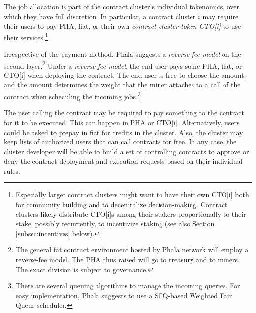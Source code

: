 \documentclass[11pt, a4paper, twocolumn]{article}
\begin{document}
The job allocation is part of the contract cluster's individual tokenomics, over which they have full discretion. In particular, a contract cluster $i$ may require their users to pay PHA, fiat, or their own \textit{contract cluster token} \textit{CTO[i]} to use their services.\footnote{%
	Especially larger contract clusters might want to have their own CTO[i] both for community building and to decentralize decision-making. Contract clusters likely distribute CTO[i]s among their stakers proportionally to their stake, possibly recurrently, to incentivize staking (see also Section \ref{subsec:incentives} below).}

Irrespective of the payment method, Phala suggests a \textit{reverse-fee model} on the second layer.\footnote{%
	The general fat contract environment hosted by Phala network will employ a reverse-fee model. The PHA thus raised will go to treasury and to miners. The exact division is subject to governance.}
Under a \textit{reverse-fee model}, the end-user pays some PHA, fiat, or CTO[i] when deploying the contract. The end-user is free to choose the amount, and the amount determines the weight that the miner attaches to a call of the contract when scheduling the incoming jobs.\footnote{%
	There are several queuing algorithms to manage the incoming queries. For easy implementation, Phala suggests to use a SFQ-based Weighted Fair Queue scheduler.}

The user calling the contract may be required to pay something to the contract for it to be executed. This can happen in PHA or CTO[i]. Alternatively, users could be asked to prepay in fiat for credits in the cluster. Also, the cluster may keep lists of authorized users that can call contracts for free. In any case, the cluster developer will be able to build a set of controlling contracts to approve or deny the contract deployment and execution requests based on their individual rules.

%
%	
\end{document}
